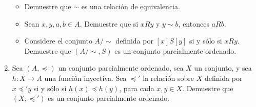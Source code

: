 \documentclass[letterpaper,11pt]{article}
\begin{document}
\begin{enumerate}
    \begin{itemize}
        \item Demuestre que $\sim$ es una relación de equivalencia.
        \item Sean $x, y, a, b \in A$. Demuestre que si $xRy$  y $y \sim b$,
        entonces $aRb$.
        \item Considere el conjunto $A/\sim$ definida por $[x]S[y]$ si y sólo 
        si $xRy$. Demuestre que $(A/\sim, S)$ es un conjunto parcialmente
        ordenado.
    \end{itemize}

    \item Sea $(A, \preceq)$ un conjunto parcialmente ordenado, sea $X$ un 
    conjunto, y sea $h: X → A$ una función inyectiva. Sea $\preceq'$ la 
    relación sobre $X$ definida por $x \preceq' y$ si y sólo si $h(x) 
    \preceq h(y)$, para cada $x, y \in X$. Demuestre que $(X, \preceq')$ es 
    un conjunto parcialmente ordenado.
\end{enumerate}
\end{document}
